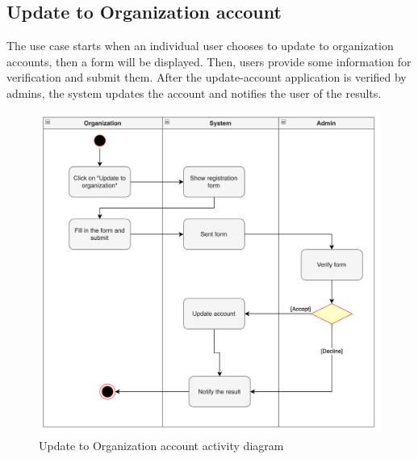 \subsection{Update to Organization account}
The use case starts when an individual user chooses to update to organization accounts, then a form will be displayed. Then, users provide some information for verification and submit them. After the update-account application is verified by admins, the system updates the account and notifies the user of the results.
\begin{figure}[H]
  \centering
  \includegraphics[width=1\textwidth]{Figures/update_org.png}
  \caption{Update to Organization account activity diagram}
  \label{fig:update-org}
\end{figure}
\newpage

